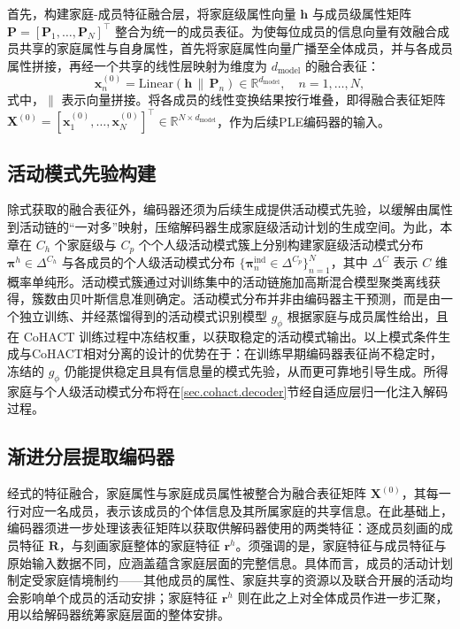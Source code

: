 首先，构建家庭-成员特征融合层，将家庭级属性向量 $\mathbf{h}$ 与成员级属性矩阵 $\mathbf{P}=[\mathbf{P}_1,\dots,\mathbf{P}_N]^{\top}$ 整合为统一的成员表征。为使每位成员的信息向量有效融合成员共享的家庭属性与自身属性，首先将家庭属性向量广播至全体成员，并与各成员属性拼接，再经一个共享的线性层映射为维度为 $d_{\text{model}}$ 的融合表征：
\begin{equation}
\mathbf{x}_n^{(0)}=\mathrm{Linear}\!\left(\mathbf{h}\,\|\,\mathbf{P}_n\right)\in\mathbb{R}^{d_{\text{model}}},\quad n=1,\dots,N,
\label{eq.cohact.fuse}
\end{equation}
式中，$\|$ 表示向量拼接。将各成员的线性变换结果按行堆叠，即得融合表征矩阵 $\mathbf{X}^{(0)}=[\mathbf{x}_1^{(0)},\dots,\mathbf{x}_N^{(0)}]^{\top}\in\mathbb{R}^{N\times d_{\text{model}}}$，作为后续PLE编码器的输入。

\subsection{活动模式先验构建}

除式获取的融合表征外，编码器还须为后续生成提供活动模式先验，以缓解由属性到活动链的``一对多''映射，压缩解码器生成家庭级活动计划的生成空间。为此，本章在 $C_h$ 个家庭级与 $C_p$ 个个人级活动模式簇上分别构建家庭级活动模式分布 $\boldsymbol{\pi}^h\in\Delta^{C_h}$ 与各成员的个人级活动模式分布 $\{\boldsymbol{\pi}_n^{\text{ind}}\in\Delta^{C_p}\}_{n=1}^{N}$，其中 $\Delta^{C}$ 表示 $C$ 维概率单纯形。活动模式簇通过对训练集中的活动链施加高斯混合模型聚类离线获得，簇数由贝叶斯信息准则确定。活动模式分布并非由编码器主干预测，而是由一个独立训练、并经蒸馏得到的活动模式识别模型 $g_\phi$ 根据家庭与成员属性给出，且在 CoHACT 训练过程中冻结权重，以获取稳定的活动模式输出。以上模式条件生成与CoHACT相对分离的设计的优势在于：在训练早期编码器表征尚不稳定时，冻结的 $g_\phi$ 仍能提供稳定且具有信息量的模式先验，从而更可靠地引导生成。所得家庭与个人级活动模式分布将在\ref{sec.cohact.decoder}节经自适应层归一化注入解码过程。

\subsection{渐进分层提取编码器}

经式的特征融合，家庭属性与家庭成员属性被整合为融合表征矩阵 $\mathbf{X}^{(0)}$，其每一行对应一名成员，表示该成员的个体信息及其所属家庭的共享信息。在此基础上，编码器须进一步处理该表征矩阵以获取供解码器使用的两类特征：逐成员刻画的成员特征 $\mathbf{R}$，与刻画家庭整体的家庭特征 $\mathbf{r}^h$。须强调的是，家庭特征与成员特征与原始输入数据不同，应涵盖蕴含家庭层面的完整信息。具体而言，成员的活动计划制定受家庭情境制约——其他成员的属性、家庭共享的资源以及联合开展的活动均会影响单个成员的活动安排；家庭特征 $\mathbf{r}^h$ 则在此之上对全体成员作进一步汇聚，用以给解码器统筹家庭层面的整体安排。


